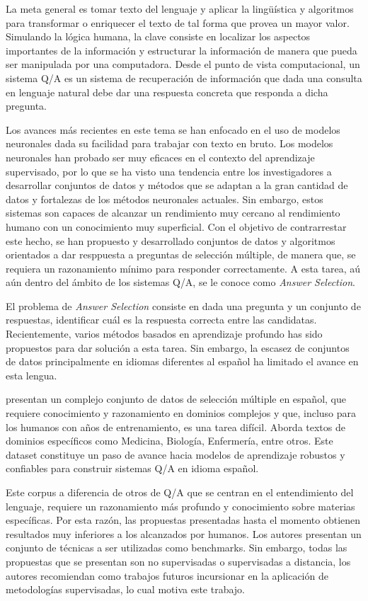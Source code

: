 La meta general es tomar texto del lenguaje y aplicar la lingüística y algoritmos para transformar o enriquecer el texto de tal forma que provea un mayor valor. Simulando la lógica humana, la clave consiste en localizar los aspectos importantes de la información y estructurar la información de manera que pueda ser manipulada por una computadora. Desde el punto de vista computacional, un sistema Q/A es un sistema de recuperación de información que dada una consulta en lenguaje natural debe dar una respuesta concreta que responda a dicha pregunta. 

Los avances más recientes en este tema se han enfocado en el uso de modelos neuronales dada su facilidad para trabajar con texto en bruto. Los modelos neuronales han probado ser muy eficaces en el contexto del aprendizaje supervisado, por lo que se ha visto una tendencia entre los investigadores a desarrollar conjuntos de datos y métodos que se adaptan a la gran cantidad de datos y fortalezas de los métodos neuronales actuales. Sin embargo, estos sistemas son capaces de alcanzar un rendimiento muy cercano al rendimiento humano con un conocimiento muy superficial. Con el objetivo de contrarrestar este hecho, se han propuesto y desarrollado conjuntos de datos y algoritmos orientados a dar resppuesta a preguntas de selección múltiple, de manera que, se requiera un razonamiento mínimo para responder correctamente. A esta tarea, aú aún dentro del ámbito de los sistemas Q/A, se le conoce como \textit{Answer Selection}. 

El problema de \textit{Answer Selection} consiste en dada una pregunta y un conjunto de respuestas, identificar cuál es la respuesta correcta entre las candidatas. Recientemente, varios métodos basados en aprendizaje profundo has sido propuestos para dar solución a esta tarea. Sin embargo, la escasez de conjuntos de datos principalmente en idiomas diferentes al español ha limitado el avance en esta lengua. 

\cite{2019-head-qa} presentan un complejo conjunto de datos de selección múltiple en español, que requiere conocimiento y razonamiento en dominios complejos y que, incluso para los humanos con años de entrenamiento, es una tarea difícil. Aborda textos de dominios específicos como Medicina, Biología, Enfermería, entre otros. Este dataset constituye un paso de avance hacia modelos de aprendizaje robustos y confiables para construir sistemas Q/A en idioma español. 

Este corpus a diferencia de otros de Q/A que se centran en el entendimiento del lenguaje, requiere un razonamiento más profundo y conocimiento sobre materias específicas. Por esta razón, las propuestas presentadas hasta el momento obtienen resultados muy inferiores a los alcanzados por humanos. Los autores presentan un conjunto de técnicas a ser utilizadas como benchmarks. Sin embargo, todas las propuestas que se presentan son no supervisadas o supervisadas a distancia, los autores recomiendan como trabajos futuros incursionar en la aplicación de metodologías supervisadas, lo cual motiva este trabajo.

